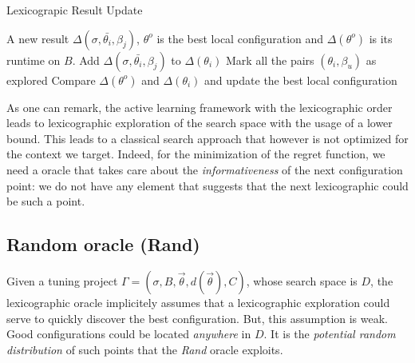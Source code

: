 \documentclass[10pt, conference, compsocconf]{IEEEtran}
\begin{document}
	\begin{algorithm}                    
	\caption{\scriptsize Lexicograpic Result Update } 	\label{alg1}  
	\begin{algorithmic}[1]
	\scriptsize
         A new result  $\Delta(\sigma, \bar{\theta_i}, \beta_j)$, 
         $\theta^o$ is the best local configuration and $\Delta(\theta^o)$ is its runtime on $B$.
        \STATE Add $\Delta(\sigma, \bar{\theta_i}, \beta_j)$ to $\Delta(\theta_i)$
        \STATE Mark all the pairs $(\theta_i, \beta_u)$ as explored
        \ELSE
        \STATE Compare $\Delta(\theta^o)$ and $\Delta(\theta_i)$ and update the best local configuration
        \ENDIF
	\ENDIF
	\end{algorithmic}
	\end{algorithm}
	\normalsize

As one can remark, the active learning framework with the lexicographic order leads to lexicographic 
exploration of the search space with the usage of a lower bound. This leads to a classical search approach that however 
is not optimized for the context we target. Indeed, for the minimization of the regret function, we need a  oracle  
that takes care about the {\it informativeness} of the next configuration point: we do not have 
any element that suggests that the next lexicographic could be such a point. 

\subsection{Random  oracle (Rand)}

Given a tuning project $\Gamma = (\sigma, B, \vec{\theta}, d(\vec{\theta}), C)$, whose search space is $D$, 
 the lexicographic  oracle implicitely assumes that a lexicographic exploration could serve to quickly discover 
the best configuration. But, this assumption is weak. Good configurations could be located {\it anywhere} in 
$D$. It is the {\it potential random distribution} of such points that the {\it Rand}  oracle exploits. 
 
\end{document}
